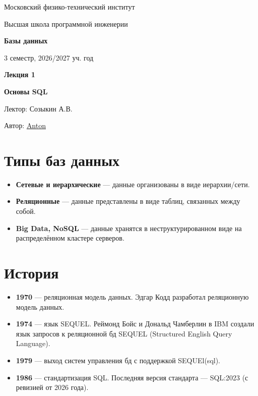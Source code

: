 \documentclass[11pt]{article}
\newcommand{\lectureNumber}{1}
\newcommand{\lectureTitle}{Основы SQL}
\newcommand{\courseName}{Базы данных}
\newcommand{\semester}{3 семестр, 2026/2027 уч. год}
\begin{document}
\hypersetup{pageanchor=false}
\begin{titlepage}
    \centering

    {\large Московский физико-технический институт \par}
    {\large Высшая школа программной инженерии \par}
    \vspace{2cm}

    {\Large \textbf{\courseName} \par}
    {\large \semester \par}

    \vspace*{\fill}

    {\Huge \textbf{Лекция \lectureNumber} \par}
    {\Huge \textbf{\lectureTitle} \par}

    \vspace*{\fill}

    {\large Лектор: Созыкин А.В. \par}
    {\large Автор: \href{impelix.t.me}{Anton} \par}

\end{titlepage}

\hypersetup{pageanchor=true}

\section{Типы баз данных}

\begin{itemize}\itemsep0pt
    \item \textbf{Сетевые и иерархические} --- данные организованы в виде иерархии/сети.
    \item \textbf{Реляционные} --- данные представлены в виде таблиц, связанных между собой.
    \item \textbf{Big Data, NoSQL} --- данные хранятся в неструктурированном виде на
    распределённом кластере серверов.
\end{itemize}

\section{История}

\begin{itemize}\itemsep0pt
    \item \textbf{1970} --- реляционная модель данных. Эдгар Кодд разработал реляционную модель данных.
    \item \textbf{1974} --- язык SEQUEL. Реймонд Бойс и Дональд Чамберлин в IBM создали язык запросов
    к реляционной бд SEQUEL (Structured English Query Language).
    \item \textbf{1979} --- выход систем управления бд с поддержкой SEQUEl(sql).
    \item \textbf{1986} --- стандартизация SQL. Последняя версия стандарта --- SQL:2023 (с ревизией от 2026 года).
\end{itemize}
\end{document}
